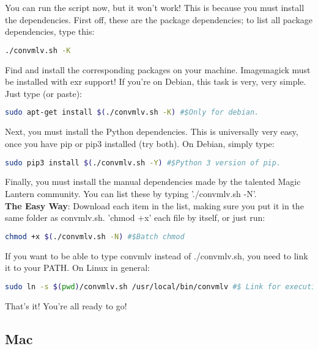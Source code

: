 \documentclass[a4paper,12pt]{article}
\begin{document}
		You can run the script now, but it won't work! This is because you must install the dependencies. First off, these are the package
		dependencies; to list all package dependencies, type this:

\begin{lstlisting}[language=bash]
	./convmlv.sh -K
\end{lstlisting}

		Find and install the corresponding packages on your machine. Imagemagick must be installed with exr support! If you're on Debian,
		this task is very, very simple. Just type (or paste):
		
\begin{lstlisting}[language=bash]
	sudo apt-get install $(./convmlv.sh -K) #$Only for debian.
\end{lstlisting}

		Next, you must install the Python dependencies. This is universally very easy, once you have pip or pip3 installed (try both).
		On Debian, simply type:
		
\begin{lstlisting}[language=bash]
	sudo pip3 install $(./convmlv.sh -Y) #$Python 3 version of pip.
\end{lstlisting}

		Finally, you must install the manual dependencies made by the talented Magic Lantern community. You can list these
		by typing './convmlv.sh -N'.\\
		
		\textbf{The Easy Way}: Download each item in the list, making sure you put it in the same folder as convmlv.sh. 'chmod +x' each
		file by itself, or just run:
		
\begin{lstlisting}[language=bash]
	chmod +x $(./convmlv.sh -N) #$Batch chmod
\end{lstlisting}
		
		If you want to be able to type convmlv instead of ./convmlv.sh, you need to link it to your PATH. On Linux in general:
		
\begin{lstlisting}[language=bash]
	sudo ln -s $(pwd)/convmlv.sh /usr/local/bin/convmlv #$ Link for execution.
\end{lstlisting}
		
		That's it! You're all ready to go!
		
	\subsection{Mac}
	
\end{document}
